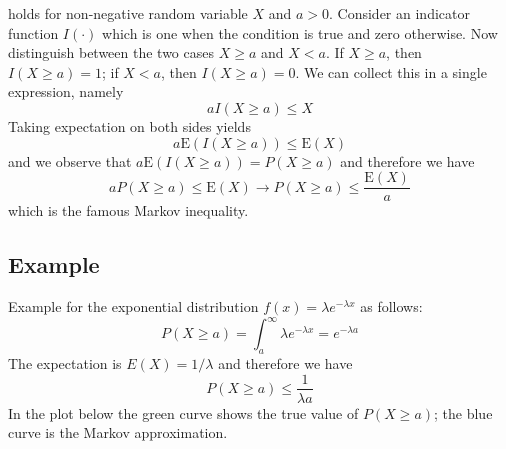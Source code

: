 

holds for non-negative random variable $X$ and $a > 0$. Consider an indicator function $I(\cdot)$ which is one when the condition is true and zero otherwise. Now distinguish between the two cases $X \geq a$ and $X < a$. If $X \geq a$, then $I(X \geq a) = 1$; if $X < a$, then $I(X \geq a) = 0$. We can collect this in a single expression, namely
%
\begin{equation*}
a I(X \geq a) \leq X
\end{equation*}
%
Taking expectation on both sides yields
%
\begin{equation*}
a \mathrm{E}(I(X \geq a)) \leq \mathrm{E}(X)
\end{equation*}
%
and we observe that $a \mathrm{E}(I(X \geq a)) = P(X \geq a)$ and therefore we have
%
\begin{equation*}
a P(X \geq a) \leq \mathrm{E}(X) \rightarrow P(X \geq a) \leq \frac{\mathrm{E}(X)}{a}
\end{equation*}
%
which is the famous Markov inequality.


\subsection*{Example}

Example for the exponential distribution $f(x) = \lambda e^{- \lambda x}$ as follows:
%
\begin{equation*}
P(X \geq a) =  \int_a^\infty \lambda e^{- \lambda x} = e^{- \lambda a}
\end{equation*}
%
The expectation is $E(X) = 1/\lambda$ and therefore we have
%
\begin{equation*}
P(X \geq a) \leq \frac{1}{\lambda a}
\end{equation*}
%
In the plot below the green curve shows the true value of $P(X \geq a)$; the blue curve is the Markov approximation.

